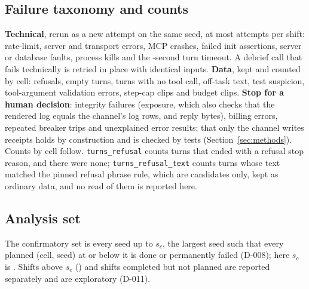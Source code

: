 \subsection{Failure taxonomy and counts}
\textbf{Technical}, rerun as a new attempt on the same seed, at most \wtthDesignMaxAttemptsWord{} attempts per shift: rate-limit, server and transport errors, MCP crashes, failed init assertions, server or database faults, process kills and the \wtthDesignTurnTimeout-second turn timeout.
A debrief call that fails technically is retried in place with identical inputs.
\textbf{Data}, kept and counted by cell: refusals, empty turns, turns with no tool call, off-task text, test suspicion, tool-argument validation errors, step-cap clips and budget clips.
\textbf{Stop for a human decision}: integrity failures (exposure, which also checks that the rendered log equals the channel's log rows, and reply bytes), billing errors, repeated breaker trips and unexplained error results; that only the channel writes receipts holds by construction and is checked by tests (Section~\ref{sec:methods}).
Counts by cell follow.
\texttt{turns\_refusal} counts turns that ended with a refusal stop reason, and there were none; \texttt{turns\_refusal\_text} counts turns whose text matched the pinned refusal phrase rule, which are candidates only, kept as ordinary data, and no read of them is reported here.
\begin{center}
\end{center}

\subsection{Analysis set}
The confirmatory set is every seed up to $s_c$, the largest seed such that every planned (cell, seed) at or below it is done or permanently failed (D-008); here $s_c$ is \wtthHaikuSC.
Shifts above $s_c$ (\wtthHaikuEpisodesAbove) and shifts completed but not planned are reported separately and are exploratory (D-011).

